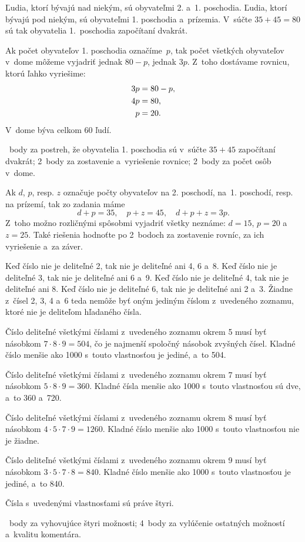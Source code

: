 {%
Ľudia, ktorí bývajú nad niekým, sú obyvateľmi 2. a~1. poschodia.
Ľudia, ktorí bývajú pod niekým, sú obyvateľmi 1. poschodia a~prízemia.
V~súčte $35+45=80$ sú tak obyvatelia 1.~poschodia započítaní dvakrát.

Ak počet obyvateľov 1. poschodia označíme~$p$, tak počet všetkých obyvateľov v~dome môžeme vyjadriť jednak $80-p$, jednak $3p$.
Z~toho dostávame rovnicu, ktorú ľahko vyriešime:
$$
\aligned
3p&=80-p, \\
4p&=80, \\
p&=20.
\endaligned
$$
V~dome býva celkom 60 ľudí.

~body za postreh, že obyvatelia 1. poschodia sú v~súčte $35+45$ započítaní dvakrát;
2~body za zostavenie a~vyriešenie rovnice;
2~body za počet osôb v~dome.

\poznamka
Ak $d$, $p$, resp. $z$ označuje počty obyvateľov na 2. poschodí, na~1. poschodí, resp. na prízemí, tak zo zadania máme
$$
d+p=35,\quad p+z=45,\quad d+p+z=3p.
$$
Z~toho možno rozličnými spôsobmi vyjadriť všetky neznáme: $d=15$, $p=20$ a~$z=25$.
Také riešenia hodnoťte
po 2~bodoch za zostavenie rovníc, za ich vyriešenie a~za záver.
\endhodnotenie

}

{%
Keď číslo nie je deliteľné 2, tak nie je deliteľné ani 4, 6 a~8.
Keď číslo nie je deliteľné 3, tak nie je deliteľné ani 6 a~9.
Keď číslo nie je deliteľné 4, tak nie je deliteľné ani 8.
Keď číslo nie je deliteľné 6, tak nie je deliteľné ani 2 a~3.
Žiadne z~čísel 2, 3, 4 a~6 teda nemôže byť oným jediným číslom z~uvedeného zoznamu, ktoré nie je deliteľom hľadaného čísla.

Číslo deliteľné všetkými číslami z~uvedeného zoznamu okrem 5 musí byť násobkom $7\cdot8\cdot9=504$, čo je najmenší spoločný násobok zvyšných čísel.
Kladné číslo menšie ako 1000 s~touto vlastnosťou je jediné, a~to 504.

Číslo deliteľné všetkými číslami z~uvedeného zoznamu okrem 7 musí byť násobkom $5\cdot8\cdot9=360$.
Kladné čísla menšie ako 1000 s~touto vlastnosťou sú dve, a~to 360 a~720.

Číslo deliteľné všetkými číslami z~uvedeného zoznamu okrem 8 musí byť násobkom $4\cdot5\cdot{7\cdot9}=1260$.
Kladné číslo menšie ako 1000 s~touto vlastnosťou nie je žiadne.

Číslo deliteľné všetkými číslami z~uvedeného zoznamu okrem 9 musí byť násobkom $3\cdot5\cdot{7\cdot8}=840$.
Kladné číslo menšie ako 1000 s~touto vlastnosťou je jediné, a~to 840.

Čísla s~uvedenými vlastnosťami sú práve štyri.

~body za vyhovujúce štyri možnosti;
4~body za vylúčenie ostatných možností a~kvalitu komentára.
\endhodnotenie}

